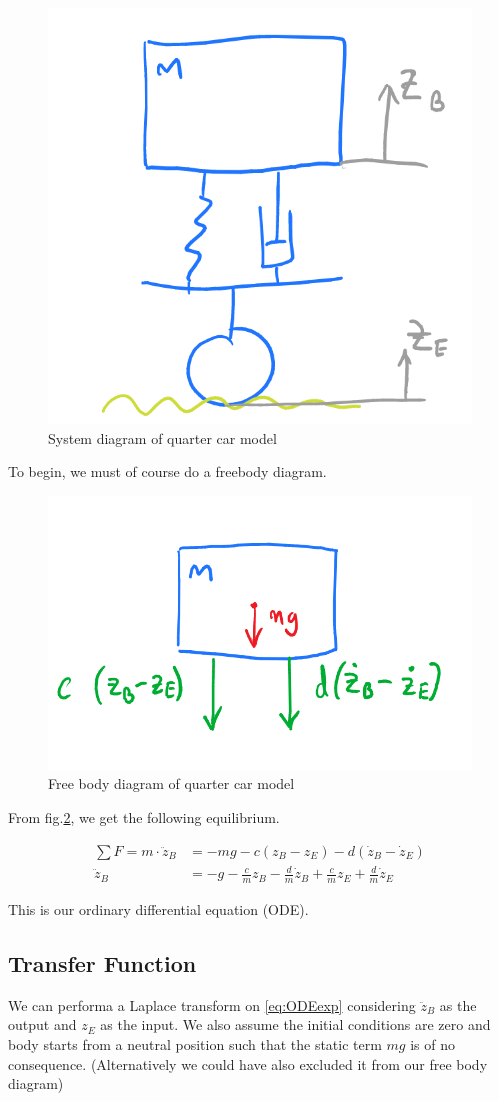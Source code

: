 \documentclass{article}
\begin{document}
\begin{figure}[H]
    \centering
    \includegraphics[width=0.5\linewidth]{systemdiagram.png}
    \caption{System diagram of quarter car model}
    \label{fig:SysD}
\end{figure}
To begin, we must of course do a freebody diagram.  

\begin{figure}[H]
    \centering
    \includegraphics[width=0.5\linewidth]{freebodydiagram.png}
    \caption{Free body diagram of quarter car model}
    \label{fig:FBD}
\end{figure}

From fig.\ref{fig:FBD}, we get the following equilibrium. 

\begin{align}
\sum F=m\cdot\ddot{z}_{B} &=-mg-c(z_{B}-z_{E})-d(\dot{z}_{B}-\dot{z}_{E})
\label{eq:ODE}
\\
\ddot{z}_{B} &=-g-\frac{c}{m}z_{B}-\frac{d}{m}\dot{z}_{B}+\frac{c}{m}z_{E}+\frac{d}{m}\dot{z}_{E}
\label{eq:ODEexp}
\end{align}

This is our ordinary differential equation (ODE).

\subsection{Transfer Function}
We can performa a Laplace transform on \eqref{eq:ODEexp} considering $\ddot{z}_{B}$ as the output and $z_E$ as the input. We also assume the initial conditions are zero and body starts from a neutral position such that the static term $mg$ is of no consequence. (Alternatively we could have also excluded it from our free body diagram) 
\end{document}
